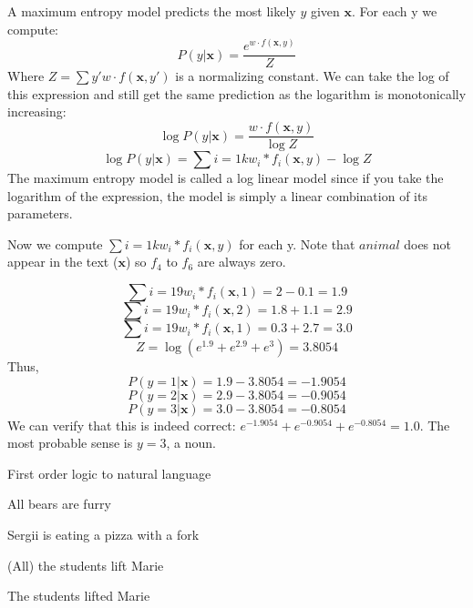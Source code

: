 \documentclass[12pt]{article}
\newenvironment{question}[2][Question]{\begin{trivlist}
\item[\hskip \labelsep {\bfseries #1}\hskip \labelsep {\bfseries #2.}]}{\end{trivlist}}
\newenvironment{answer}[2][Answer]{\begin{trivlist}
\item[\hskip \labelsep {\bfseries #1}\hskip \labelsep {\bfseries #2:}]}{\end{trivlist}}
\begin{document}
\begin{answer}{a)}

A maximum entropy model predicts the most likely $y$ given $\boldsymbol{x}$. For each y we compute:
$$P(y|\boldsymbol{x})=\frac{e^{w \cdot f(\boldsymbol{x},y)}}{Z}$$
Where $Z=\sum{y'}{}{w \cdot f(\boldsymbol{x}, y')}$ is a normalizing constant.
We can take the log of this expression and still get the same prediction as the logarithm is monotonically increasing:
$$\log{P(y|\boldsymbol{x})}=\frac{w \cdot f(\boldsymbol{x},y)}{\log{Z}}$$
$$\log{P(y|\boldsymbol{x})}=\sum{i=1}{k}{w_i * f_i(\boldsymbol{x},y)} - \log{Z}$$
The maximum entropy model is called a log linear model since if you take the logarithm of the expression, the model is simply a linear combination of its parameters.
\end{answer}
\begin{answer}{b)}

Now we compute $\sum{i=1}{k}{w_i * f_i(\boldsymbol{x},y)}$ for each y. Note that $animal$ does not appear in the text ($\boldsymbol{x}$) so $f_4$ to $f_6$ are always zero.

$$\sum{i=1}{9}{w_i * f_i(\boldsymbol{x},1)}=2-0.1=1.9$$
$$\sum{i=1}{9}{w_i * f_i(\boldsymbol{x},2)}=1.8+1.1=2.9$$
$$\sum{i=1}{9}{w_i * f_i(\boldsymbol{x},1)}=0.3+2.7=3.0$$
$$Z=\log{(e^{1.9}+e^{2.9}+e^3)}=3.8054$$
Thus,
$$P(y=1|\boldsymbol{x})=1.9-3.8054=-1.9054$$
$$P(y=2|\boldsymbol{x})=2.9-3.8054=-0.9054$$
$$P(y=3|\boldsymbol{x})=3.0-3.8054=-0.8054$$
We can verify that this is indeed correct: $e^{-1.9054} + e^{-0.9054} + e^{-0.8054} = 1.0$. The most probable sense is $y=3$, a noun.
\end{answer}

\begin{question}{3}
First order logic to natural language
\end{question}

\begin{answer}{a)}{}

All bears are furry
\end{answer}
\begin{answer}{b)}{}

Sergii is eating a pizza with a fork
\end{answer}
\begin{answer}{c)}{}

(All) the students lift Marie
\end{answer}
\begin{answer}{d)}{}

The students lifted Marie
\end{answer}
\end{document}
